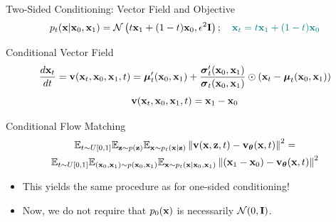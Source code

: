\documentclass{beamer}
\begin{document}
\begin{frame}{Two-Sided Conditioning: Vector Field and Objective}
	\vspace{-0.3cm}
	\[
		p_t(\mathbf{x} | \mathbf{x}_0, \mathbf{x}_1) = \mathcal{N}\left(t \mathbf{x}_1 + (1 - t) \mathbf{x}_0, \epsilon^2 \mathbf{I}\right); \quad {\color{teal}\mathbf{x}_t = t \mathbf{x}_1 + (1 - t) \mathbf{x}_0}
	\]
	\vspace{-0.5cm}
	\begin{block}{Conditional Vector Field}
		\vspace{-0.5cm}
		\[
			 \frac{d\mathbf{x}_t}{dt} = \mathbf{v}(\mathbf{x}_t, \mathbf{x}_0, \mathbf{x}_1, t) =  \boldsymbol{\mu}_t'(\mathbf{x}_0, \mathbf{x}_1) + \frac{\boldsymbol{\sigma}_t'(\mathbf{x}_0, \mathbf{x}_1)}{\boldsymbol{\sigma}_t(\mathbf{x}_0, \mathbf{x}_1)} \odot (\mathbf{x}_t - \boldsymbol{\mu}_t(\mathbf{x}_0, \mathbf{x}_1))
		\]
		\eqpause
		\vspace{-0.5cm}
		\[
			\mathbf{v}(\mathbf{x}_t, \mathbf{x}_0, \mathbf{x}_1, t) = \mathbf{x}_1 - \mathbf{x}_0
		\]
		\vspace{-0.7cm}
	\end{block}
	\eqpause
	\begin{block}{Conditional Flow Matching}
		\vspace{-0.7cm}
		\begin{multline*}
			\mathbb{E}_{t \sim U[0, 1]} \mathbb{E}_{\mathbf{z} \sim p(\mathbf{z})} \mathbb{E}_{\mathbf{x} \sim p_t(\mathbf{x} | \mathbf{z})}\left\| \mathbf{v}(\mathbf{x}, \mathbf{z}, t) - \mathbf{v}_{\boldsymbol{\theta}}(\mathbf{x}, t) \right\|^2 = \\
		 \mathbb{E}_{t \sim U[0, 1]} \mathbb{E}_{(\mathbf{x}_0, \mathbf{x}_1) \sim p(\mathbf{x}_0, \mathbf{x}_1)} \mathbb{E}_{\mathbf{x} \sim p_t(\mathbf{x} | \mathbf{x}_0, \mathbf{x}_1)} \left\| (\mathbf{x}_1 - \mathbf{x}_0) - \mathbf{v}_{\boldsymbol{\theta}}(\mathbf{x}, t) \right\|^2
		\end{multline*}
	\end{block}
	\eqpause
	\vspace{-0.3cm}
	\begin{itemize}
		\item This yields the same procedure as for one-sided conditioning!
		\item Now, we do not require that $p_0(\mathbf{x})$ is necessarily $\mathcal{N}(0, \mathbf{I})$.
	\end{itemize} 
\end{frame}
\end{document}
